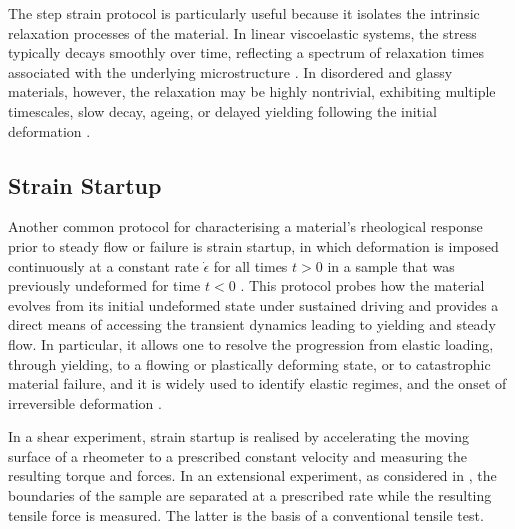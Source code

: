 The step strain protocol is particularly useful because it isolates the intrinsic relaxation processes of the material. In linear viscoelastic systems, the stress typically decays smoothly over time, reflecting a spectrum of relaxation times associated with the underlying microstructure \cite{macoskoRheologyPrinciplesMeasurements1994,larson_structure_1999}. In disordered and glassy materials, however, the relaxation may be highly nontrivial, exhibiting multiple timescales, slow decay, ageing, or delayed yielding following the initial deformation \cite{fielding_complex_2007,moorcroft_age-dependent_2011,lockwood_ultradelayed_2025}.

\subsection{Strain Startup} \label{sec:ShearStartup}

Another common protocol for characterising a material’s rheological response prior to steady flow or failure is strain startup, in which deformation is imposed continuously at a constant rate $\dot{\epsilon}$ for all times $t>0$ in a sample that was previously undeformed for time $t<0$ \cite{larson_structure_1999,tannerEngineeringRheology2000,barnes_introduction_1989}. This protocol probes how the material evolves from its initial undeformed state under sustained driving and provides a direct means of accessing the transient dynamics leading to yielding and steady flow. In particular, it allows one to resolve the progression from elastic loading, through yielding, to a flowing or plastically deforming state, or to catastrophic material failure, and it is widely used to identify elastic regimes, and the onset of irreversible deformation \cite{divouxShearBandingComplex2016,moorcroft_age-dependent_2011}.

In a shear experiment, strain startup is realised by accelerating the moving surface of a rheometer to a prescribed constant velocity and measuring the resulting torque and forces. In an extensional experiment, as considered in , the boundaries of the sample are separated at a prescribed rate while the resulting tensile force is measured. The latter is the basis of a conventional tensile test.

